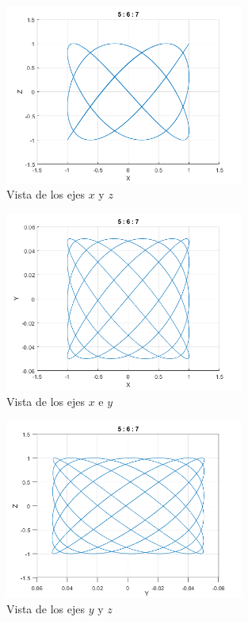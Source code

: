 \documentclass{article}
\begin{document}
\begin{figure}[H]
\centering
    \includegraphics[width=0.7\textwidth]{images/gif3DImage2.png}
    \caption{Vista de los ejes $x$ y $z$}
\end{figure}

\begin{figure}[H]
\centering
    \includegraphics[width=0.7\textwidth]{images/gif3DImage3.png}
    \caption{Vista de los ejes $x$ e $y$}
\end{figure}

\begin{figure}[H]
\centering
    \includegraphics[width=0.7\textwidth]{images/gif3DImage4.png}
    \caption{Vista de los ejes $y$ y $z$}
\end{figure}
\end{document}
